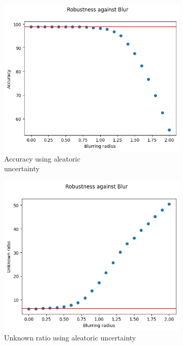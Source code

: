 \begin{figure}[h]
	\centering
	\begin{subfigure}{.33\textwidth}
		\centering
		\includegraphics[width=0.9\linewidth]{ImageFiles/EvalBNN/BL/AU/acc}
		\caption{Accuracy using aleatoric \\ uncertainty}
		\label{fig:bl_au_acc}
	\end{subfigure}%
	\begin{subfigure}{.33\textwidth}
		\centering
		\includegraphics[width=0.9\linewidth]{ImageFiles/EvalBNN/BL/AU/unkn}
		\caption{Unknown ratio using aleatoric uncertainty}
		\label{fig:bl_au_unkn}
	\end{subfigure}%
	\begin{subfigure}{.33\textwidth}

\end{subfigure}
\end{figure}
